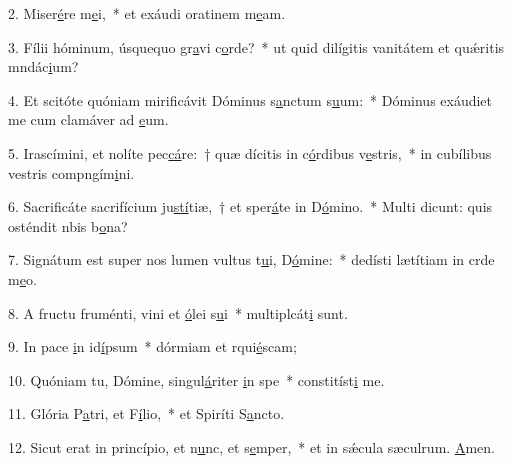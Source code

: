 2. Miser\uline{é}re m\uline{e}i,~* et exáudi oratinem m\uline{e}am.\par 
3. Fílii hóminum, úsquequo gr\uline{a}vi c\uline{o}rde?~* ut quid dilígitis vanitátem et quǽritis mndác\uline{i}um?\par 
4. Et scitóte quóniam mirificávit Dóminus s\uline{a}nctum s\uline{u}um:~* Dóminus exáudiet me cum clamáver ad \uline{e}um.\par 
5. Irascímini, et nolíte pec\uline{cá}re:~† quæ dícitis in c\uline{ó}rdibus v\uline{e}stris,~* in cubílibus vestris compngím\uline{i}ni.\par 
6. Sacrificáte sacrifícium ju\uline{stí}tiæ,~† et sper\uline{á}te in D\uline{ó}mino.~* Multi dicunt: quis osténdit nbis b\uline{o}na?\par 
7. Signátum est super nos lumen vultus t\uline{u}i, D\uline{ó}mine:~* dedísti lætítiam in crde m\uline{e}o.\par 
8. A fructu fruménti, vini et \uline{ó}lei s\uline{u}i~* multiplcát\uline{i} sunt.\par 
9. In pace \uline{i}n id\uline{í}psum~* dórmiam et rqui\uline{é}scam;\par 
10. Quóniam tu, Dómine, singul\uline{á}riter \uline{i}n spe~* constitíst\uline{i} me.\par 
11. Glória P\uline{a}tri, et F\uline{í}lio,~* et Spiríti S\uline{a}ncto.\par 
12. Sicut erat in princípio, et n\uline{u}nc, et s\uline{e}mper,~* et in sǽcula sæculrum. \uline{A}men.\par 
